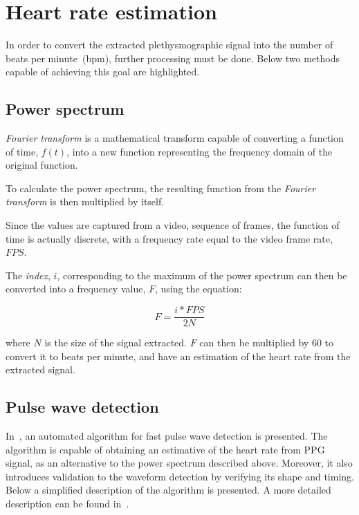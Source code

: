\section{Heart rate estimation} \label{sec:sota:estimation}

In order to convert the extracted plethysmographic signal into the number
of beats per minute~(bpm), further processing must be done. Below two methods
capable of achieving this goal are highlighted.

\subsection{Power spectrum} \label{sec:sota:estimation:power}

\emph{Fourier transform} is a mathematical transform capable of converting
a function of time, $f(t)$, into a new function representing the frequency
domain of the original function.

To calculate the power spectrum, the resulting function from the
\emph{Fourier transform} is then multiplied by itself.

Since the values are captured from a video, sequence of frames, the function
of time is actually discrete, with a frequency rate equal to the video frame
rate, $FPS$.

The \emph{index}, $i$, corresponding to the maximum of the power spectrum can
then be converted into a frequency value, $F$, using the equation:

\begin{equation}
  F = \frac{i * FPS}{2 N}
\end{equation}

where $N$ is the size of the signal extracted. $F$ can then be multiplied by
$60$ to convert it to beats per minute, and have an estimation of the heart
rate from the extracted signal.

\subsection{Pulse wave detection} \label{sec:sota:estimation:pulse}

In~\cite{Nenova2010Automated}, an automated algorithm for fast pulse wave
detection is presented. The algorithm is capable of obtaining an
estimative of the heart rate from PPG signal, as an alternative to the power
spectrum described above. Moreover, it also introduces validation to the
waveform detection by verifying its shape and timing. Below a simplified
description of the algorithm is presented. A more detailed description can be
found in~\cite{Nenova2010Automated}.

